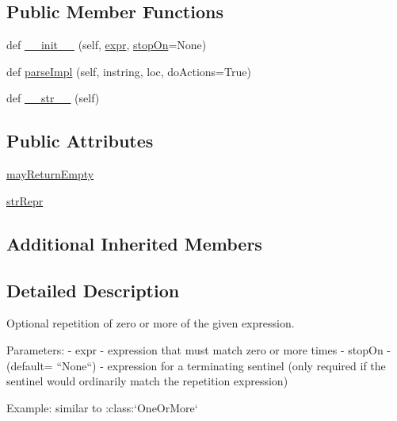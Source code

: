 \subsection*{Public Member Functions}
\begin{DoxyCompactItemize}
\item 
def \hyperlink{classpyparsing_1_1ZeroOrMore_a6c70ae10ea73381163059668f7d22bce}{\+\_\+\+\_\+init\+\_\+\+\_\+} (self, \hyperlink{classpyparsing_1_1ParseElementEnhance_a0139048279aeac38804a10d131d3c340}{expr}, \hyperlink{classpyparsing_1_1__MultipleMatch_aae02df8892bd80aec4ffe8cee4def728}{stop\+On}=None)
\item 
def \hyperlink{classpyparsing_1_1ZeroOrMore_a41e78bde28221517cd22d867ef2746f2}{parse\+Impl} (self, instring, loc, do\+Actions=True)
\item 
def \hyperlink{classpyparsing_1_1ZeroOrMore_a404e7151a94f0224267a838afdcd7dbb}{\+\_\+\+\_\+str\+\_\+\+\_\+} (self)
\end{DoxyCompactItemize}
\subsection*{Public Attributes}
\begin{DoxyCompactItemize}
\item 
\hyperlink{classpyparsing_1_1ZeroOrMore_ab713347f237f2ce4e43417f2494d5a0a}{may\+Return\+Empty}
\item 
\hyperlink{classpyparsing_1_1ZeroOrMore_af3e8cdb86761828dbf2e55d1e27ea150}{str\+Repr}
\end{DoxyCompactItemize}
\subsection*{Additional Inherited Members}


\subsection{Detailed Description}
\begin{DoxyVerb}Optional repetition of zero or more of the given expression.

Parameters:
 - expr - expression that must match zero or more times
 - stopOn - (default= ``None``) - expression for a terminating sentinel
      (only required if the sentinel would ordinarily match the repetition
      expression)

Example: similar to :class:`OneOrMore`
\end{DoxyVerb}
 

